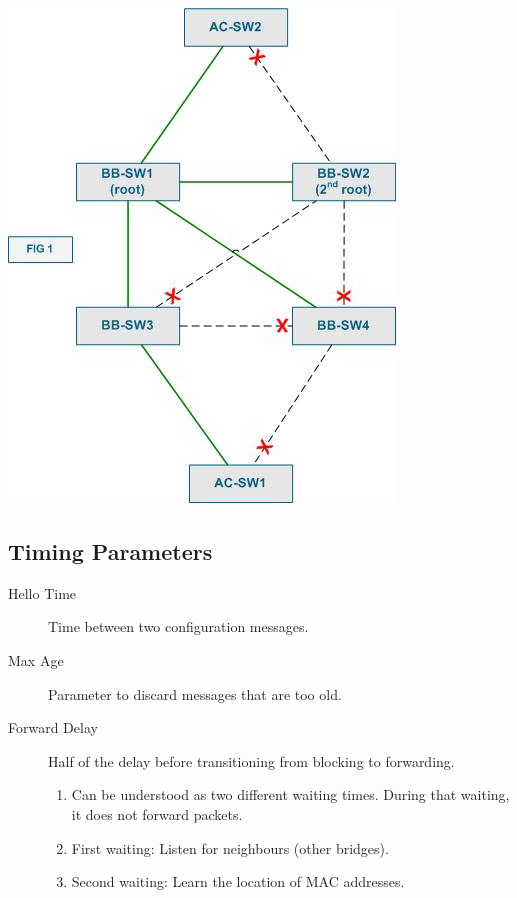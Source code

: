 \documentclass{article}
\begin{document}
\centerline{\includegraphics[scale=0.5]{images/STP-convergence.png}\\[1cm]}



\subsection{Timing Parameters}

\begin{description}
    \item[Hello Time] Time between two configuration messages.
    \item[Max Age] Parameter to discard messages that are too old.
    \item[Forward Delay] Half of the delay before transitioning from blocking to forwarding.
    \begin{enumerate}
   		\item Can be understood as two different waiting times. During that waiting, it does not forward packets.
   		\item First waiting: Listen for neighbours (other bridges).
   		\item Second waiting: Learn the location of MAC addresses.
	\end{enumerate}
\end{description}
\end{document}

